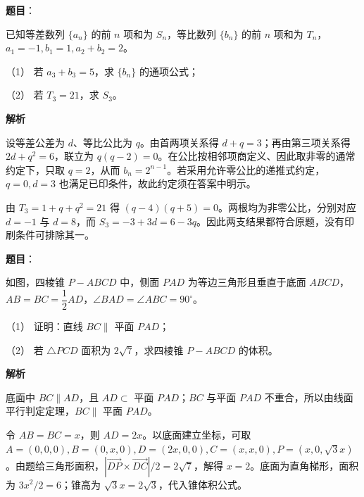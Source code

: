 \begin{answer}

\textbf{题目}：

已知等差数列 \(\{a_n\}\) 的前 \(n\) 项和为 \(S_n\)，等比数列 \(\{b_n\}\) 的前 \(n\) 项和为 \(T_n\)，\(a_1=-1,b_1=1,a_2+b_2=2\)。

（1） 若 \(a_3+b_3=5\)，求 \(\{b_n\}\) 的通项公式；

（2） 若 \(T_3=21\)，求 \(S_3\)。

\textbf{解析}


设等差公差为 \(d\)、等比公比为 \(q\)。由首两项关系得 \(d+q=3\)；再由第三项关系得 \(2d+q^2=6\)，联立为 \(q(q-2)=0\)。在公比按相邻项商定义、因此取非零的通常约定下，只取 \(q=2\)，从而 \(b_n=2^{n-1}\)。若采用允许零公比的递推式约定，\(q=0,d=3\) 也满足已印条件，故此约定须在答案中明示。


由 \(T_3=1+q+q^2=21\) 得 \((q-4)(q+5)=0\)。两根均为非零公比，分别对应 \(d=-1\) 与 \(d=8\)，而 \(S_3=-3+3d=6-3q\)。因此两支结果都符合原题，没有印刷条件可排除其一。



\end{answer}
\begin{answer}

\textbf{题目}：

如图，四棱锥 \(P-ABCD\) 中，侧面 \(PAD\) 为等边三角形且垂直于底面 \(ABCD\)，\(AB=BC=\dfrac12 AD\)，\(\angle BAD=\angle ABC=90^\circ\)。
\nopagebreak[4]
\begin{center}\end{center}
\nopagebreak[4]
（1） 证明：直线 \(BC\parallel\) 平面 \(PAD\)；

（2） 若 \(\triangle PCD\) 面积为 \(2\sqrt7\)，求四棱锥 \(P-ABCD\) 的体积。

\textbf{解析}


底面中 \(BC\parallel AD\)，且 \(AD\subset\) 平面 \(PAD\)；\(BC\) 与平面 \(PAD\) 不重合，所以由线面平行判定定理，\(BC\parallel\) 平面 \(PAD\)。


令 \(AB=BC=x\)，则 \(AD=2x\)。以底面建立坐标，可取 \(A=(0,0,0),B=(0,x,0),D=(2x,0,0),C=(x,x,0),P=(x,0,\sqrt3x)\)。由题给三角形面积，\(|\overrightarrow{DP}\times\overrightarrow{DC}|/2=2\sqrt7\)，解得 \(x=2\)。底面为直角梯形，面积为 \(3x^2/2=6\)；锥高为 \(\sqrt3x=2\sqrt3\)，代入锥体积公式。



\end{answer}
